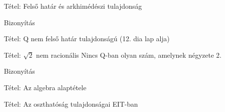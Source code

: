 \documentclass{beamer}
\begin{document}
\begin{frame}

\begin{block}{Tétel: Felső határ és arkhimédészi tulajdonság}
\end{block}

\begin{block}{Bizonyítás}
\end{block}

\end{frame}

\begin{frame}

\begin{block}{Tétel: Q nem felső határ tulajdonságú}
(12. dia lap alja)
\end{block}

\end{frame}

\begin{frame}

\begin{block}{Tétel: $\sqrt{2}$ nem racionális}
Nincs Q-ban olyan szám, amelynek négyzete 2.
\end{block}

\begin{block}{Bizonyítás}
\end{block}

\end{frame}


\begin{frame}

\begin{block}{Tétel: Az algebra alaptétele}
\end{block}

\end{frame}

\begin{frame}[plain]
\end{frame}

\begin{frame}

\begin{block}{Tétel: Az oszthatóság tulajdonságai EIT-ban}
\end{block}

\end{frame}
\end{document}
